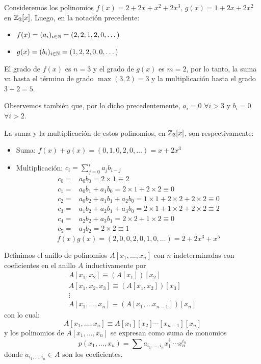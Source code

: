\begin{fmd-example}
	Consideremos los polinomios $f(x) = 2 + 2x + x^2 + 2x^3$, $g(x)=1 + 2x + 2x^2$ en $\mathbb{Z}_3[x]$. Luego, en la notación precedente:
	\begin{itemize}
		\item $f(x) = (a_i)_{i\in \mathbb{N}} = (2, 2, 1, 2, 0, \dots)$
		\item $g(x) = (b_i)_{i \in \mathbb{N}} = (1, 2, 2, 0, 0, \dots)$
	\end{itemize}
	
	El grado de $f(x)$ es $n=3$ y el grado de $g(x)$ es $m=2$, por lo tanto, la suma va hasta el término de grado $\max(3, 2) = 3$ y la multiplicación hasta el grado $3 + 2 = 5$.
	
	Observemos también que, por lo dicho precedentemente, $a_i = 0$ $\forall i > 3$ y $b_i = 0$ $\forall i > 2$.
	
	La suma y la multiplicación de estos polinomios, en $\mathbb{Z}_3[x]$, son respectivamente:
	\begin{itemize}
		\item Suma: $f(x) + g(x) = (0, 1, 0, 2, 0, \dots) = x + 2x^3$
		\item Multiplicación: $c_i = \sum_{j=0}^{i} a_j b_{i-j}$
		\begin{align*}
			c_0 =& a_0b_0 = 2 \times 1 \equiv 2\\
			c_1 =& a_0b_1 + a_1b_0 = 2\times 1 + 2 \times 2 \equiv 0\\
			c_2 =& a_0b_2 + a_1b_1 + a_2b_0 = 1 \times 1 + 2 \times 2 + 2 \times 2 \equiv 0\\
			c_3 =& a_1b_2 + a_2b_1 + a_3b_0 = 2 \times 1 + 1 \times 2 + 2 \times 2 \equiv 2\\
			c_4 =& a_2b_2 + a_3b_1 = 2 \times 2 + 1 \times 2 \equiv 0\\
			c_5 =& a_3b_2 = 2 \times 2 \equiv 1
		\end{align*}
		\[f(x)g(x) = (2, 0, 0, 2, 0, 1, 0, \dots) = 2 + 2x^3 + x^5 \]
	\end{itemize}
	
\end{fmd-example}

\begin{fmd-definition}
	Definimos el anillo de polinomios $A[x_1, \dots, x_n]$ con $n$ indeterminadas con coeficientes en el anillo $A$ inductivamente por
	\[ \begin{array}{c}
		A[x_1, x_2] \equiv \left(A[x_1] \right)[x_2]\\
		A[x_1, x_2, x_3] \equiv \left(A[x_1, x_2] \right)[x_3]\\
		\vdots \\
		A[x_1, \dots, x_n] \equiv \left( A[x_1, \dots x_{n-1}] \right)[x_n]
	\end{array} \]
	con lo cual:
	\[ A[x_1, \dots, x_n] \equiv A[x_1][x_2]\cdots [x_{n-1}][x_n] \]
	y los polinomios de $A[x_1, \dots, x_n]$ se expresan como suma de monomios
	\[ p(x_1, \dots, x_n) = \sum a_{i_1,\dots, i_n}x_1^{i_1} \cdots x_n^{i_n} \]
	donde $a_{i_1,\dots, i_n} \in A$ son los coeficientes.
\end{fmd-definition}

